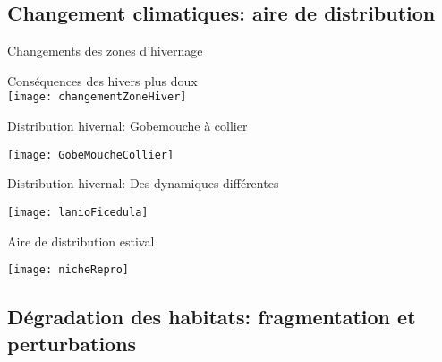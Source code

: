 \documentclass[10pt]{beamer}
\begin{document}
\subsection{Changement climatiques: aire de distribution}

\begin{frame}{Changements des zones d’hivernage}
  \begin{center}
   Conséquences des hivers plus doux \\
  \vspace{10pt}
  \texttt{[image: changementZoneHiver]}
  \end{center}

\end{frame}

\begin{frame}{Distribution hivernal: Gobemouche à collier}
  \begin{center}
   \texttt{[image: GobeMoucheCollier]}
  \end{center}
\tiny{\cite{Barbet-Massin2009}}
\end{frame}

\begin{frame}{Distribution hivernal: Des dynamiques différentes}
  \begin{center}
   \texttt{[image: lanioFicedula]}
  \end{center}
\tiny{\cite{Barbet-Massin2009}}
\end{frame}

\begin{frame}{Aire de distribution estival}
  \begin{center}
   \texttt{[image: nicheRepro]}
  \end{center}
\tiny{\cite{Barbet-Massin2012}}
\end{frame}


\subsection{Dégradation des habitats: fragmentation et perturbations}
\end{document}

